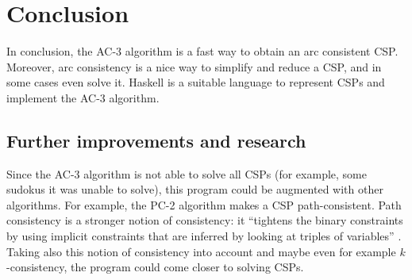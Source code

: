 \section{Conclusion}\label{sec:conclusion}

In conclusion, the AC-3 algorithm is a fast way to obtain an arc consistent CSP. Moreover, arc consistency is a nice way to simplify and reduce a CSP, and in some cases even solve it.
Haskell is a suitable language to represent CSPs and implement the AC-3 algorithm.

\subsection{Further improvements and research}\label{sec:further}

Since the AC-3 algorithm is not able to solve all CSPs (for example, some sudokus it was unable to solve), this program could be augmented with other algorithms.
For example, the PC-2 algorithm makes a CSP path-consistent. Path consistency is a stronger notion of consistency: it ``tightens the binary constraints by using implicit constraints that are inferred by looking at triples of variables'' \cite[p.~210]{AIMA}.
Taking also this notion of consistency into account and maybe even for example $k$-consistency, the program could come closer to solving CSPs.

